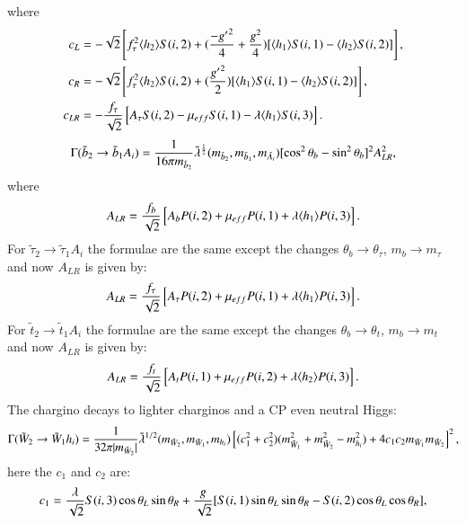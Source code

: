 \documentclass[final,3p,times]{elsarticle}
\begin{document}
where
\begin{align}
c_{L} &= -\sqrt{2}\left[f_{\tau}^2 \langle h_2 \rangle S(i,2) + ({-{g'}^2 \over 4} + {g^2 \over 4})[\langle h_1 \rangle S(i,1) - \langle h_{2} \rangle S(i,2)]\right], \\
c_{R} &= -\sqrt{2}\left[f_{\tau}^2 \langle h_2 \rangle S(i,2) + ({{g'}^2 \over 2})[\langle h_1 \rangle S(i,1) - \langle h_{2} \rangle S(i,2)]\right], \\
c_{LR} &= -{f_{\tau} \over \sqrt{2}}\left[A_{\tau}S(i,2) - \mu_{eff}S(i,1)-\lambda \langle h_{1} \rangle S(i,3)\right].
\end{align}
\begin{equation} \label{sb2sb1ANMSSM}
\Gamma(\tilde{b}_2 \rightarrow \tilde{b}_1 A_{i}) = {1 \over 16 \pi m_{\tilde{b}_2}} \tilde{\lambda}^{1 \over 2}(m_{\tilde{b}_2},m_{\tilde{b}_1},m_{\tilde{A}_i})[\cos^2 \theta_b - \sin^2 \theta_b]^2 A_{LR}^2,
\end{equation}
where
\begin{equation}
A_{LR} = {f_{b} \over \sqrt{2}} \left[A_{b}P(i,2) + \mu_{eff} P(i,1) + \lambda \langle h_{1} \rangle P(i,3)\right].
\end{equation}
For $\tilde{\tau}_2 \rightarrow \tilde{\tau}_1 A_{i}$ the formulae are the same except the changes $\theta_{b} \rightarrow \theta_{\tau}$, $m_b \rightarrow m_{\tau}$ and now $A_{LR}$ is given by:
\begin{equation}
A_{LR} = {f_{\tau} \over \sqrt{2}}\left[A_{\tau}P(i,2) + \mu_{eff}P(i,1) + \lambda \langle h_{1} \rangle P(i,3)\right].
\end{equation}
For $\tilde{t}_2 \rightarrow \tilde{t}_1 A_{i}$ the formulae are the same except the changes $\theta_b \rightarrow \theta_t$, $m_b \rightarrow m_t$ and now $A_{LR}$ is given by:
\begin{equation}
A_{LR} = {f_{t} \over \sqrt{2}}\left[A_{t}P(i,1) + \mu_{eff}P(i,2) + \lambda \langle h_{2} \rangle P(i,3)\right].
\end{equation}
The chargino decays to lighter charginos and a CP even neutral Higgs:
\begin{equation} \label{ch2ch1hNMSSM}
\Gamma(\tilde{W}_2 \rightarrow \tilde{W}_1 h_{i}) = {1 \over 32 \pi |m_{\tilde{W}_2}|} \tilde{\lambda}^{1/2}
(m_{\tilde{W}_2},m_{\tilde{W}_1},m_{h_i})\left[(c_{1}^2 + c_{2}^2)(m_{\tilde{W}_1}^2 + m_{\tilde{W}_2}^2 - m_{h_i}^2) + 4c_{1} c_{2} m_{\tilde{W}_1} m_{\tilde{W}_2}\right]^2,
\end{equation}
here the $c_{1}$ and $c_{2}$ are:
\begin{equation}
c_{1} = {\lambda \over \sqrt{2}}S(i,3)\cos\theta_L \sin\theta_R + {g \over \sqrt{2}}[S(i,1)\sin\theta_L \sin\theta_R - S(i,2) \cos\theta_L \cos\theta_R],
\end{equation}
\end{document}
